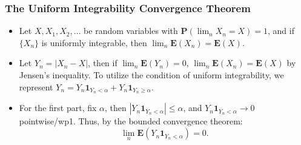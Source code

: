 \documentclass[handout]{beamer}
\newcommand{\BP}{\mathbf{P}}
\newcommand{\BE}{\mathbf{E}}
\newcommand{\BI}{\mathbf{1}}
\begin{document}
\frame
{
  \frametitle{The Uniform Integrability Convergence Theorem} 

   \begin{itemize}
   
  
\item<1->[] \begin{Theorem} Let $X, X_1, X_2, \ldots $ be random variables with $\BP(\lim_n X_n=X)=1$, and if  $\{X_n\}$ is uniformly integrable, then $\lim_n \BE(X_n)=\BE(X)$.\end{Theorem}
                
\item<2->  Let $Y_n=|X_n-X|$, then if $\lim_n \BE(Y_n)=0$, $\lim_n \BE(X_n)=\BE(X)$  by Jensen's inequality. To utilize the condition of uniform integrability, we represent $Y_n=Y_n\BI_{Y_n<\alpha}+Y_n\BI_{Y_n\geq \alpha}$. 
                
\item<3->[-] For the first part, fix $\alpha$, then $|Y_n\BI_{Y_n<\alpha}|\leq \alpha$, and $Y_n\BI_{Y_n<\alpha}\rightarrow 0$ pointwise/wp1. Thus, by the bounded convergence theorem:
                                $$\lim_n \BE(Y_n\BI_{Y_n<\alpha})=0.$$
                                
                                    
                                                                                           

                                                                                                           
                              \end{itemize}
}
\end{document}
